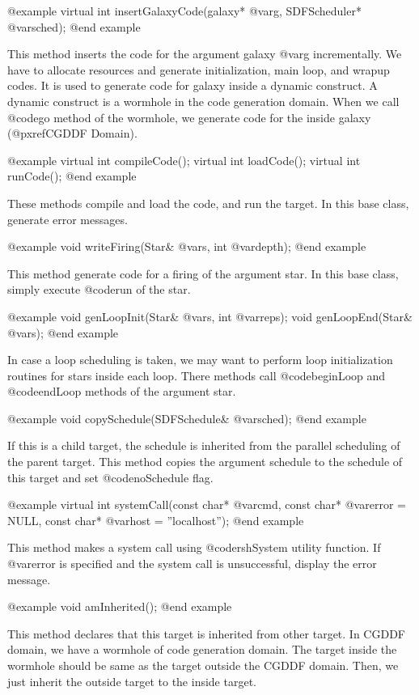 @example
virtual int insertGalaxyCode(galaxy* @var{g}, SDFScheduler* @var{sched});
@end example

This method inserts the code for the argument galaxy @var{g} incrementally.
We have to allocate resources and generate initialization, main loop, and
wrapup codes. It is used to generate code for galaxy inside a dynamic
construct. A dynamic construct is a wormhole in the code generation domain.
When we call @code{go} method of the wormhole, we generate code
for the inside galaxy (@pxref{CGDDF Domain}).

@example
virtual int compileCode();
virtual int loadCode();
virtual int runCode();
@end example

These methods compile and load the code, and run the target. In this base
class, generate error messages.

@example
void writeFiring(Star& @var{s}, int @var{depth});
@end example

This method generate code for a firing of the argument star. In this base
class, simply execute @code{run} of the star.

@example
void genLoopInit(Star& @var{s}, int @var{reps});
void genLoopEnd(Star& @var{s});
@end example

In case a loop scheduling is taken, we may want to perform loop
initialization routines for stars inside each loop. There methods
call @code{beginLoop} and @code{endLoop} methods of the argument
star.

@example
void copySchedule(SDFSchedule& @var{sched});
@end example

If this is a child target, the schedule is inherited from the parallel
scheduling of the parent target. This method copies the argument
schedule to the schedule of this target and set @code{noSchedule} flag.

@example
virtual int systemCall(const char* @var{cmd}, const char* @var{error} = NULL, const char* @var{host} = ''localhost'');
@end example

This method makes a system call using @code{rshSystem} utility function.
If @var{error} is specified and the system call is unsuccessful, display the
error message.

@example
void amInherited();
@end example

This method declares that this target is inherited from other target.
In CGDDF domain, we have a wormhole of code generation domain. The
target inside the wormhole should be same as the target outside the
CGDDF domain. Then, we just inherit the outside target to the inside target.

